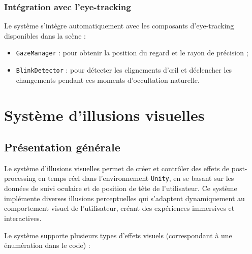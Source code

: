 \documentclass[12pt]{report}
\begin{document}
\subsection{Intégration avec l'eye-tracking}

Le système s'intègre automatiquement avec les composants d'eye-tracking disponibles dans la scène :
\begin{itemize}
    \vspace{2mm}
    \item \texttt{GazeManager} : pour obtenir la position du regard et le rayon de précision ;
    \vspace{2mm}
    \item \texttt{BlinkDetector} : pour détecter les clignements d'œil et déclencher les changements pendant ces moments d'occultation naturelle.
    \vspace{2mm}
\end{itemize}

\chapter{Système d'illusions visuelles}
\section{Présentation générale}
Le système d'illusions visuelles permet de créer et contrôler des effets de post-processing en temps réel dans l'environnement \texttt{Unity}, en se basant sur les données de suivi oculaire et de position de tête de l'utilisateur. Ce système implémente diverses illusions perceptuelles qui s'adaptent dynamiquement au comportement visuel de l'utilisateur, créant des expériences immersives et interactives.

Le système supporte plusieurs types d'effets visuels (correspondant à une énumération dans le code) :
\end{document}
